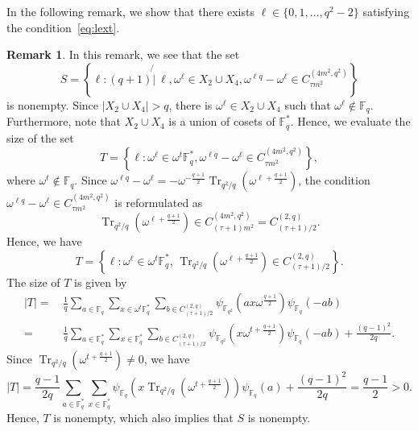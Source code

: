 \documentclass[10pt]{amsart}
\theoremstyle{definition}
\newtheorem{rema}[theo]{Remark}
\DeclareMathOperator{\Tr}{Tr}
\newcommand*\F{{\mathbb F}}
\newcommand*{\notmid}{\mathbin{\not{|}\:}}
\begin{document}
In the following remark, we show that there exists $\ell \in \{0,1,\ldots,q^2-2\}$ satisfying the condition~\eqref{eq:lext}.

\begin{rema}\label{rem:cond25}
In this remark, we see that the set
\[
S=\left\{\ell :(q+1) \notmid \ell, \omega^{\ell}\in X_2\cup X_4,
\omega^{\ell q}-\omega^{\ell}\in C_{\tau m^2}^{(4m^2,q^2)} \right\}
\]
is nonempty. Since $|X_2\cup X_4|>q$, there is $\omega^\ell \in X_2\cup X_4$ such that $\omega^\ell \not \in \F_q$. Furthermore, note that $X_2\cup X_4$ is a union of cosets of $\F_{q}^\ast$. Hence, we evaluate the size of the set
\[
T=\left\{\ell: \omega^{\ell}\in \omega^t \F_q^\ast,
\omega^{\ell q}-\omega^{\ell}\in C_{\tau m^2}^{(4m^2,q^2)} \right\},
\]
where $\omega^t\not \in \F_q$. Since $\omega^{\ell q}-\omega^\ell=-\omega^{-\frac{q+1}{2}}\Tr_{q^2/q}(\omega^{\ell+\frac{q+1}{2}})$, the condition $\omega^{\ell q}-\omega^{\ell}\in C_{\tau m^2}^{(4m^2,q^2)}$ is reformulated as
\[
\Tr_{q^2/q}(\omega^{\ell+\frac{q+1}{2}})\in C_{(\tau +1)m^2}^{(4m^2,q^2)}= C_{(\tau +1)/2}^{(2,q)}.
\]
Hence, we have
\[
T=\left\{\ell:\omega^\ell \in \omega^t \F_q^\ast,\,\Tr_{q^2/q}(\omega^{\ell+\frac{q+1}{2}})\in C_{(\tau +1)/2}^{(2,q)}\right\}.
\]
The size of $T$ is given by
\begin{align*}
|T|=&\, \frac{1}{q}\sum_{a\in \F_q}\sum_{x\in \omega^t \F_q^\ast}\sum_{b\in C_{(\tau +1)/2}^{(2,q)}} \psi_{\F_{q^2}}(ax\omega^{\frac{q+1}{2}})\psi_{\F_q}(-ab)\\
=&\, \frac{1}{q}\sum_{a\in \F_q^\ast}\sum_{x\in \F_q^\ast}\sum_{b\in C_{(\tau +1)/2}^{(2,q)}} \psi_{\F_{q^2}}(x\omega^{t+\frac{q+1}{2}})\psi_{\F_q}(-ab)+\frac{(q-1)^2}{2q}.
\end{align*}
Since $\Tr_{q^2/q}(\omega^{t+\frac{q+1}{2}})\not=0$, we have
\[
|T|=\frac{q-1}{2q}\sum_{a\in \F_q^\ast}\sum_{x\in \F_q^\ast} \psi_{\F_{q}}(x\Tr_{q^2/q}(\omega^{t+\frac{q+1}{2}}))\psi_{\F_q}(a)+\frac{(q-1)^2}{2q} =\frac{q-1}{2}>0.
\]
Hence, $T$ is nonempty, which also implies that $S$ is nonempty.
\end{rema}
\end{document}
